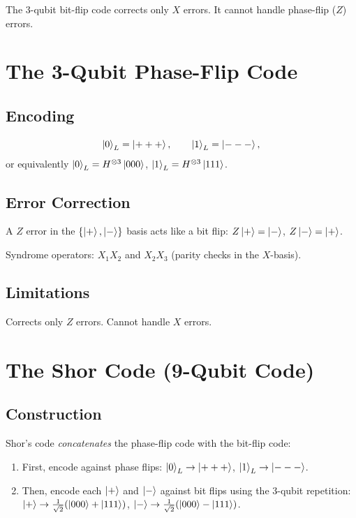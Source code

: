 \documentclass[11pt]{article}
\theoremstyle{definition}
\begin{document}
The 3-qubit bit-flip code corrects only $X$ errors.  It cannot handle phase-flip ($Z$) errors.

\section{The 3-Qubit Phase-Flip Code}

\subsection{Encoding}

\[
    \ket{0}_L = \ket{+++}, \qquad \ket{1}_L = \ket{---},
\]
or equivalently $\ket{0}_L = H^{\otimes 3}\ket{000}$, $\ket{1}_L = H^{\otimes 3}\ket{111}$.

\subsection{Error Correction}

A $Z$ error in the $\{\ket{+},\ket{-}\}$ basis acts like a bit flip: $Z\ket{+}=\ket{-}$, $Z\ket{-}=\ket{+}$.

Syndrome operators: $X_1 X_2$ and $X_2 X_3$ (parity checks in the $X$-basis).

\subsection{Limitations}

Corrects only $Z$ errors.  Cannot handle $X$ errors.

\section{The Shor Code (9-Qubit Code)}

\subsection{Construction}

Shor's code \emph{concatenates} the phase-flip code with the bit-flip code:
\begin{enumerate}
    \item First, encode against phase flips: $\ket{0}_L\to\ket{+++}$, $\ket{1}_L\to\ket{---}$.
    \item Then, encode each $\ket{+}$ and $\ket{-}$ against bit flips using the 3-qubit repetition: $\ket{+}\to\frac{1}{\sqrt{2}}(\ket{000}+\ket{111})$, $\ket{-}\to\frac{1}{\sqrt{2}}(\ket{000}-\ket{111})$.
\end{enumerate}
\end{document}
